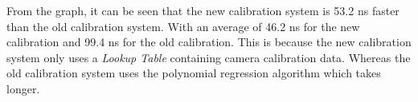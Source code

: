 From the graph, it can be seen that the new calibration system is 53.2 ns faster than the old calibration system. With an average of 46.2 ns for the new calibration and 99.4 ns for the old calibration. This is because the new calibration system only uses a \emph{Lookup Table} containing camera calibration data. Whereas the old calibration system uses the polynomial regression algorithm which takes longer.


